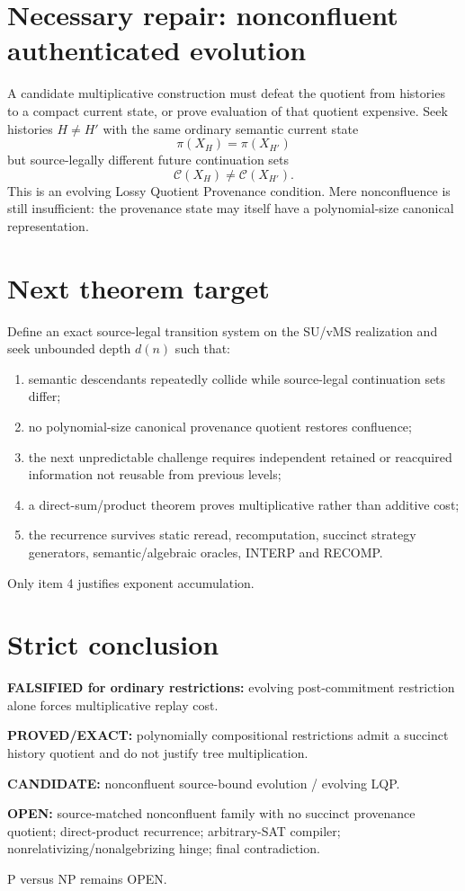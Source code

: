 \documentclass[11pt]{article}
\begin{document}
\section*{Necessary repair: nonconfluent authenticated evolution}
A candidate multiplicative construction must defeat the quotient from histories to a compact current state, or prove evaluation of that quotient expensive. Seek histories \(H\ne H'\) with the same ordinary semantic current state
\[
\pi(X_H)=\pi(X_{H'})
\]
but source-legally different future continuation sets
\[
\mathcal C(X_H)\ne\mathcal C(X_{H'}).
\]
This is an evolving Lossy Quotient Provenance condition. Mere nonconfluence is still insufficient: the provenance state may itself have a polynomial-size canonical representation.

\section*{Next theorem target}
Define an exact source-legal transition system on the SU/vMS realization and seek unbounded depth \(d(n)\) such that:
\begin{enumerate}
\item semantic descendants repeatedly collide while source-legal continuation sets differ;
\item no polynomial-size canonical provenance quotient restores confluence;
\item the next unpredictable challenge requires independent retained or reacquired information not reusable from previous levels;
\item a direct-sum/product theorem proves multiplicative rather than additive cost;
\item the recurrence survives static reread, recomputation, succinct strategy generators, semantic/algebraic oracles, INTERP and RECOMP.
\end{enumerate}
Only item 4 justifies exponent accumulation.

\section*{Strict conclusion}
\textbf{FALSIFIED for ordinary restrictions:} evolving post-commitment restriction alone forces multiplicative replay cost.

\textbf{PROVED/EXACT:} polynomially compositional restrictions admit a succinct history quotient and do not justify tree multiplication.

\textbf{CANDIDATE:} nonconfluent source-bound evolution / evolving LQP.

\textbf{OPEN:} source-matched nonconfluent family with no succinct provenance quotient; direct-product recurrence; arbitrary-SAT compiler; nonrelativizing/nonalgebrizing hinge; final contradiction.

P versus NP remains OPEN.
\end{document}
